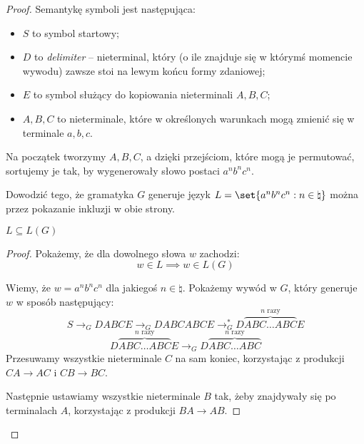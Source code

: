 \begin{proof}
    Semantykę symboli jest następująca:
    \begin{itemize}
        \item \(S\) to symbol startowy;
        \item \(D\) to \textit{delimiter} -- nieterminal, który (o ile znajduje się w którymś momencie wywodu) zawsze stoi na lewym końcu formy zdaniowej;
        \item \(E\) to symbol służący do kopiowania nieterminali \(A, B, C\);
        \item \(A, B, C\) to nieterminale, które w określonych warunkach mogą zmienić się w terminale \(a, b, c\). 
    \end{itemize}
    
    Na początek tworzymy \(A, B, C\), a dzięki przejściom, które mogą je permutować, sortujemy je tak, by wygenerowały słowo postaci \(a^nb^nc^n\). 
    
    Dowodzić tego, że gramatyka \(G\) generuje język \(L = \set{a^nb^nc^n : n \in \natural}\) można przez pokazanie inkluzji w obie strony.
    
    
    \begin{lemma}
        \(L \subseteq L(G)\)
    \end{lemma}
    \begin{proof}
        Pokażemy, że dla dowolnego słowa \(w\) zachodzi:
        \[ w \in L \implies w \in L(G) \] 
        
        Wiemy, że \(w = a^nb^nc^n\) dla jakiegoś \(n \in \natural\). Pokażemy wywód w \(G\), który generuje \(w\) w sposób następujący:
        \[ 
            S \rightarrow_G DABCE \rightarrow_G DABCABCE \rightarrow^*_G D \overbrace{ABC \dots ABC}^{\text{\(n\) razy}}E
        \]
        \[
            D \overbrace{ABC \dots ABC}^{\text{\(n\) razy}}E \rightarrow_G D \overbrace{ABC \dots ABC}^{\text{\(n\) razy}}
        \]
        Przesuwamy wszystkie nieterminale \(C\) na sam koniec, korzystając z produkcji \(CA \rightarrow AC\) i \(CB \rightarrow BC\).
        
        Następnie ustawiamy wszystkie nieterminale \(B\) tak, żeby znajdywały się po terminalach \(A\), korzystając z produkcji \(BA \rightarrow AB\). 
        

\end{proof}
\end{proof}
